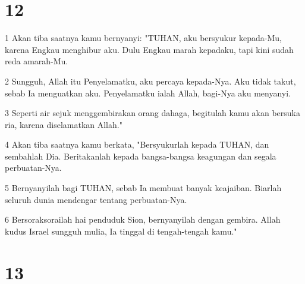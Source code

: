 \chapter{12}

\par 1 Akan tiba saatnya kamu bernyanyi: "TUHAN, aku bersyukur kepada-Mu, karena Engkau menghibur aku. Dulu Engkau marah kepadaku, tapi kini sudah reda amarah-Mu.
\par 2 Sungguh, Allah itu Penyelamatku, aku percaya kepada-Nya. Aku tidak takut, sebab Ia menguatkan aku. Penyelamatku ialah Allah, bagi-Nya aku menyanyi.
\par 3 Seperti air sejuk menggembirakan orang dahaga, begitulah kamu akan bersuka ria, karena diselamatkan Allah."
\par 4 Akan tiba saatnya kamu berkata, "Bersyukurlah kepada TUHAN, dan sembahlah Dia. Beritakanlah kepada bangsa-bangsa keagungan dan segala perbuatan-Nya.
\par 5 Bernyanyilah bagi TUHAN, sebab Ia membuat banyak keajaiban. Biarlah seluruh dunia mendengar tentang perbuatan-Nya.
\par 6 Bersoraksorailah hai penduduk Sion, bernyanyilah dengan gembira. Allah kudus Israel sungguh mulia, Ia tinggal di tengah-tengah kamu."

\chapter{13}

